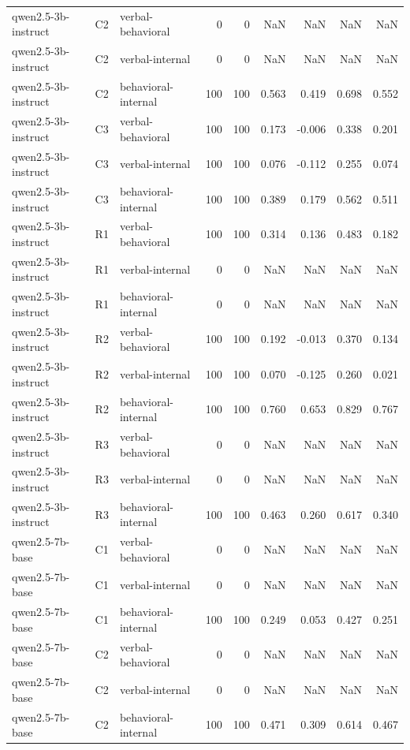 \begin{table}
\begin{tabular}{lllrrrrrr}
qwen2.5-3b-instruct & C2 & verbal-behavioral & 0 & 0 & NaN & NaN & NaN & NaN \\
qwen2.5-3b-instruct & C2 & verbal-internal & 0 & 0 & NaN & NaN & NaN & NaN \\
qwen2.5-3b-instruct & C2 & behavioral-internal & 100 & 100 & 0.563 & 0.419 & 0.698 & 0.552 \\
qwen2.5-3b-instruct & C3 & verbal-behavioral & 100 & 100 & 0.173 & -0.006 & 0.338 & 0.201 \\
qwen2.5-3b-instruct & C3 & verbal-internal & 100 & 100 & 0.076 & -0.112 & 0.255 & 0.074 \\
qwen2.5-3b-instruct & C3 & behavioral-internal & 100 & 100 & 0.389 & 0.179 & 0.562 & 0.511 \\
qwen2.5-3b-instruct & R1 & verbal-behavioral & 100 & 100 & 0.314 & 0.136 & 0.483 & 0.182 \\
qwen2.5-3b-instruct & R1 & verbal-internal & 0 & 0 & NaN & NaN & NaN & NaN \\
qwen2.5-3b-instruct & R1 & behavioral-internal & 0 & 0 & NaN & NaN & NaN & NaN \\
qwen2.5-3b-instruct & R2 & verbal-behavioral & 100 & 100 & 0.192 & -0.013 & 0.370 & 0.134 \\
qwen2.5-3b-instruct & R2 & verbal-internal & 100 & 100 & 0.070 & -0.125 & 0.260 & 0.021 \\
qwen2.5-3b-instruct & R2 & behavioral-internal & 100 & 100 & 0.760 & 0.653 & 0.829 & 0.767 \\
qwen2.5-3b-instruct & R3 & verbal-behavioral & 0 & 0 & NaN & NaN & NaN & NaN \\
qwen2.5-3b-instruct & R3 & verbal-internal & 0 & 0 & NaN & NaN & NaN & NaN \\
qwen2.5-3b-instruct & R3 & behavioral-internal & 100 & 100 & 0.463 & 0.260 & 0.617 & 0.340 \\
qwen2.5-7b-base & C1 & verbal-behavioral & 0 & 0 & NaN & NaN & NaN & NaN \\
qwen2.5-7b-base & C1 & verbal-internal & 0 & 0 & NaN & NaN & NaN & NaN \\
qwen2.5-7b-base & C1 & behavioral-internal & 100 & 100 & 0.249 & 0.053 & 0.427 & 0.251 \\
qwen2.5-7b-base & C2 & verbal-behavioral & 0 & 0 & NaN & NaN & NaN & NaN \\
qwen2.5-7b-base & C2 & verbal-internal & 0 & 0 & NaN & NaN & NaN & NaN \\
qwen2.5-7b-base & C2 & behavioral-internal & 100 & 100 & 0.471 & 0.309 & 0.614 & 0.467 \\

\end{tabular}
\end{table}

